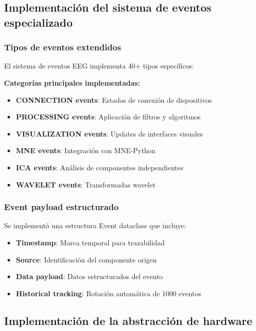 \subsection{Implementación del sistema de eventos especializado}
\label{subsec:eventos_especializados_eeg}

\subsubsection{Tipos de eventos extendidos}

El sistema de eventos EEG implementa 40+ tipos específicos:

\textbf{Categorías principales implementadas:}
\begin{itemize}
    \item \textbf{CONNECTION events}: Estados de conexión de dispositivos
    \item \textbf{PROCESSING events}: Aplicación de filtros y algoritmos
    \item \textbf{VISUALIZATION events}: Updates de interfaces visuales
    \item \textbf{MNE events}: Integración con MNE-Python
    \item \textbf{ICA events}: Análisis de componentes independientes
    \item \textbf{WAVELET events}: Transformadas wavelet
\end{itemize}

\subsubsection{Event payload estructurado}

Se implementó una estructura Event dataclass que incluye:
\begin{itemize}
    \item \textbf{Timestamp}: Marca temporal para trazabilidad
    \item \textbf{Source}: Identificación del componente origen
    \item \textbf{Data payload}: Datos estructurados del evento
    \item \textbf{Historical tracking}: Rotación automática de 1000 eventos
\end{itemize}

\subsection{Implementación de la abstracción de hardware}
\label{subsec:abstraccion_hardware_impl}

